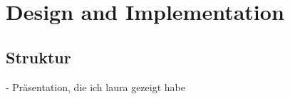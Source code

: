\chapter{Design and Implementation}
\label{Implementation}
	\section{Struktur}
	\label{Implementierung:Struktur}
	- Präsentation, die ich laura gezeigt habe\\
		
		
	
	